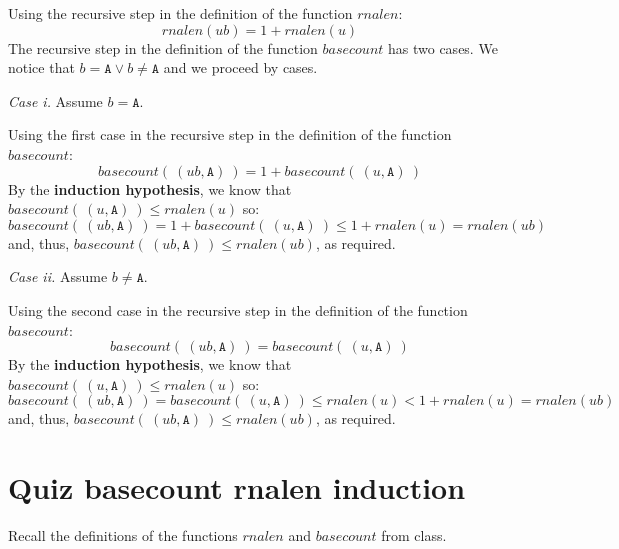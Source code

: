 \documentclass[12pt, oneside]{article}
\newcommand{\A}[0]{\texttt{A}}
\begin{document}
Using the recursive step in the definition of the function $rnalen$:
\[
    rnalen(ub) = 1 + rnalen(u)
\]
The recursive step in the definition of the function $basecount$ has two cases. We notice that 
$b = \A \lor b \neq \A$ and we proceed by cases.

{\it Case i.} Assume $b = \A$.

Using the first case in the recursive step in the definition of the function $basecount$:
\[
    basecount(~(ub, \A)~) = 1 + basecount(~(u,\A)~)
\]
By the {\bf induction hypothesis}, we know that $basecount(~(u,\A)~) \leq rnalen(u)$ so:
\[
    basecount(~(ub, \A)~) = 1 + basecount(~(u,\A)~) \leq 1 + rnalen(u) = rnalen (ub)
\]
and, thus, $basecount(~(ub,\A)~) \leq rnalen(ub)$, as required.

{\it Case ii.} Assume $b \neq \A$. 

Using the second case in the recursive step in the definition of the function $basecount$:
\[
    basecount(~(ub, \A)~) = basecount(~(u,\A)~)
\]
By the {\bf induction hypothesis}, we know that $basecount(~(u,\A)~) \leq rnalen(u)$ so:
\[
    basecount(~(ub, \A)~) = basecount(~(u,\A)~) \leq rnalen(u) < 1 + rnalen(u) = rnalen (ub)
\]
and, thus, $basecount(~(ub,\A)~) \leq rnalen(ub)$, as required.
 \vfill
\section*{Quiz basecount rnalen induction}


Recall the definitions of the functions $rnalen$ and $basecount$ from class.
\end{document}

